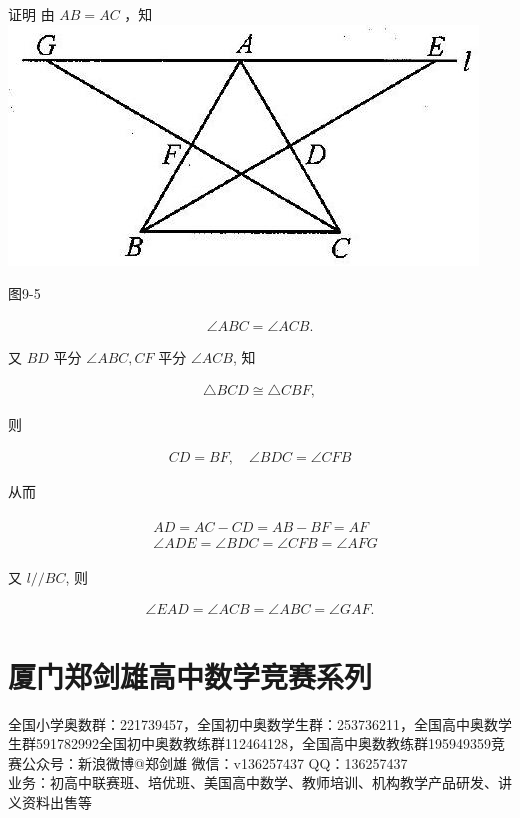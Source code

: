 \documentclass[10pt]{article}
\begin{document}
证明 由 $A B=A C$ ，知\\
\includegraphics[max width=\textwidth, center]{2024_10_30_2c8f45efd4a519b08e1ag-091(1)}

图9-5

\begin{align*}
\angle A B C=\angle A C B .
\end{align*}

又 $B D$ 平分 $\angle A B C, C F$ 平分 $\angle A C B$, 知

\begin{align*}
\triangle B C D \cong \triangle C B F,
\end{align*}

则

\begin{align*}
C D=B F, \quad \angle B D C=\angle C F B
\end{align*}

从而

\begin{align*}
\begin{aligned}
& A D=A C-C D=A B-B F=A F \\
& \angle A D E=\angle B D C=\angle C F B=\angle A F G
\end{aligned}
\end{align*}

又 $l / / B C$, 则

\begin{align*}
\angle E A D=\angle A C B=\angle A B C=\angle G A F .
\end{align*}

\section*{厦门郑剑雄高中数学竞赛系列}
全国小学奥数群：221739457，全国初中奥数学生群：253736211，全国高中奥数学生群591782992全国初中奥数教练群112464128，全国高中奥数教练群195949359竞赛公众号：新浪微博@郑剑雄 微信：v136257437 QQ：136257437\\
业务：初高中联赛班、培优班、美国高中数学、教师培训、机构教学产品研发、讲义资料出售等
\end{document}
